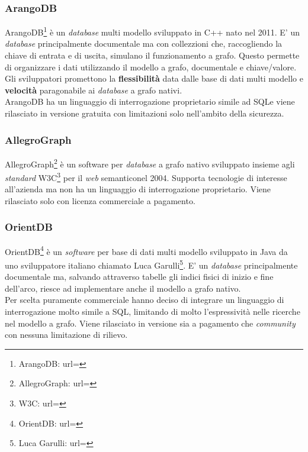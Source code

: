 \subsubsection{ArangoDB}
ArangoDB\footnote{ArangoDB: url= } è un \textit{database} multi modello sviluppato in C++ nato nel 2011. E' un \textit{database} principalmente documentale ma con collezzioni che, raccogliendo la chiave di entrata e di uscita, simulano il funzionamento a grafo. Questo permette di organizzare i dati utilizzando il modello a grafo, documentale e chiave/valore.\\
Gli sviluppatori promettono la \textbf{flessibilità} data dalle base di dati multi modello e \textbf{velocità} paragonabile ai \textit{database} a grafo nativi.\\
ArangoDB ha un linguaggio di interrogazione proprietario simile ad SQL\glsfirstoccur e viene rilasciato in versione gratuita con limitazioni solo nell'ambito della sicurezza.
\subsubsection{AllegroGraph}
AllegroGraph\footnote{AllegroGraph: url= } è un software per \textit{database} a grafo nativo sviluppato insieme agli \textit{standard} W3C\footnote{W3C: url= } per il \textit{web} semantico\glsfirstoccur  nel 2004. Supporta tecnologie di interesse all'azienda ma non ha un linguaggio di interrogazione proprietario. Viene rilasciato solo con licenza commerciale a pagamento.
\subsubsection{OrientDB}
OrientDB\footnote{OrientDB: url= } è un \textit{software} per base di dati multi modello sviluppato in Java da uno sviluppatore italiano chiamato Luca Garulli\footnote{Luca Garulli: url= }. E' un \textit{database} principalmente documentale ma, salvando attraverso tabelle gli indici fisici di inizio e fine dell'arco, riesce ad implementare anche il modello a grafo nativo. \\
Per scelta puramente commerciale hanno deciso di integrare un linguaggio di interrogazione molto simile a SQL, limitando di molto l'espressività nelle ricerche nel modello a grafo. Viene rilasciato in versione sia a pagamento che \textit{community} con nessuna limitazione di rilievo.
